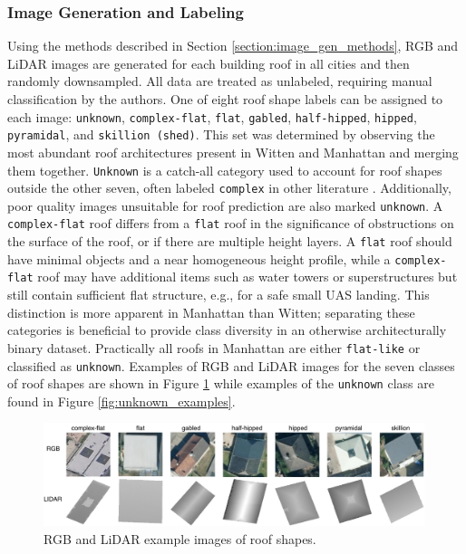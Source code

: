 \subsubsection{Image Generation and Labeling}

Using the methods described in Section \ref{section:image_gen_methods}, RGB and LiDAR images are generated for each building roof in all cities and then randomly downsampled.  All data are treated as unlabeled, requiring manual classification by the authors. One of eight roof shape labels can be assigned to each image:  \texttt{unknown}, \texttt{complex-flat}, \texttt{flat}, \texttt{gabled}, \texttt{half-hipped}, \texttt{hipped}, \texttt{pyramidal}, and \texttt{skillion (shed)}. This set was determined by observing the most abundant roof architectures present in Witten and Manhattan and merging them together.  \texttt{Unknown} is a catch-all category used to account for roof shapes outside the other seven, often labeled \texttt{complex} in other literature \cite{mohajeri_city-scale_2018, alidoost_knowledge_2016}. Additionally, poor quality images unsuitable for roof prediction are also marked \texttt{unknown}. A \texttt{complex-flat} roof differs from a \texttt{flat} roof in the significance of obstructions on the surface of the roof, or if there are multiple height layers. A \texttt{flat} roof should have minimal objects and a near homogeneous height profile, while a \texttt{complex-flat} roof may have additional items such as water towers or superstructures but still contain sufficient flat structure, e.g., for a safe small UAS landing. This distinction is more apparent in Manhattan than Witten; separating these categories is beneficial to provide class diversity in an otherwise architecturally binary dataset. Practically all roofs in Manhattan are either \texttt{flat-like} or classified as \texttt{unknown}.  Examples of RGB and LiDAR images for the seven classes of roof shapes are shown in Figure \ref{fig:building_examples} while examples of the \texttt{unknown} class are found in Figure \ref{fig:unknown_examples}.

\begin{figure}[H]
\centering
\includegraphics[width=0.99\textwidth]{chapter_4_roofshape/imgs/RoofShapes.pdf}
\caption{RGB and LiDAR example images of roof shapes.}
\label{fig:building_examples}
\end{figure}

